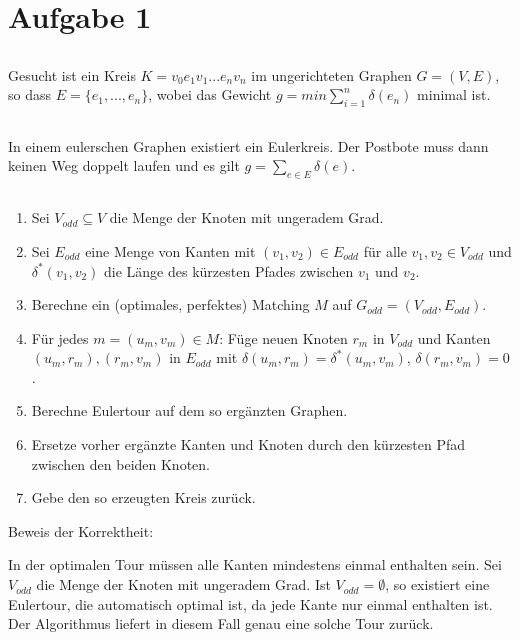 \documentclass[a4paper]{article}
\begin{document}
\section{Aufgabe 1}

\subsection{}
Gesucht ist ein Kreis $K = v_0 e_1 v_1 ... e_n v_n$ im ungerichteten Graphen $G
= (V, E)$, so dass $E = \{ e_1, ..., e_n \}$, wobei das Gewicht
$g = min \sum\limits_{i=1}^{n} \delta(e_n)$ minimal ist.

\subsection{}
In einem eulerschen Graphen existiert ein Eulerkreis. Der Postbote muss dann
keinen Weg doppelt laufen und es gilt $g = \sum\limits_{e \in E} \delta(e)$.

\subsection{}
\begin{enumerate}
\item Sei $V_{odd} \subseteq V$ die Menge der Knoten mit ungeradem Grad.
\item Sei $E_{odd}$ eine Menge von Kanten mit $(v_1, v_2) \in E_{odd}$ für alle $v_1, v_2 \in V_{odd}$ und $\delta^*(v_1, v_2)$ die Länge des kürzesten Pfades zwischen $v_1$ und $v_2$.
\item Berechne ein (optimales, perfektes) Matching $M$ auf $G_{odd} = (V_{odd}, E_{odd})$.
\item Für jedes $m = (u_m, v_m) \in M$: Füge neuen Knoten $r_m$ in $V_{odd}$ und Kanten $(u_m, r_m), (r_m, v_m)$ in $E_{odd}$ mit $\delta(u_m, r_m) = \delta^*(u_m, v_m)$, $\delta(r_m, v_m) = 0$.
\item Berechne Eulertour auf dem so ergänzten Graphen.
\item Ersetze vorher ergänzte Kanten und Knoten durch den kürzesten Pfad zwischen den beiden Knoten.
\item Gebe den so erzeugten Kreis zurück.
\end{enumerate}

Beweis der Korrektheit:

In der optimalen Tour müssen alle Kanten mindestens einmal enthalten sein.
Sei $V_{odd}$ die Menge der Knoten mit ungeradem Grad.
Ist $V_{odd} = \emptyset$, so existiert eine Eulertour, die automatisch
optimal ist, da jede Kante nur einmal enthalten ist. Der Algorithmus liefert
in diesem Fall genau eine solche Tour zurück.
\end{document}
